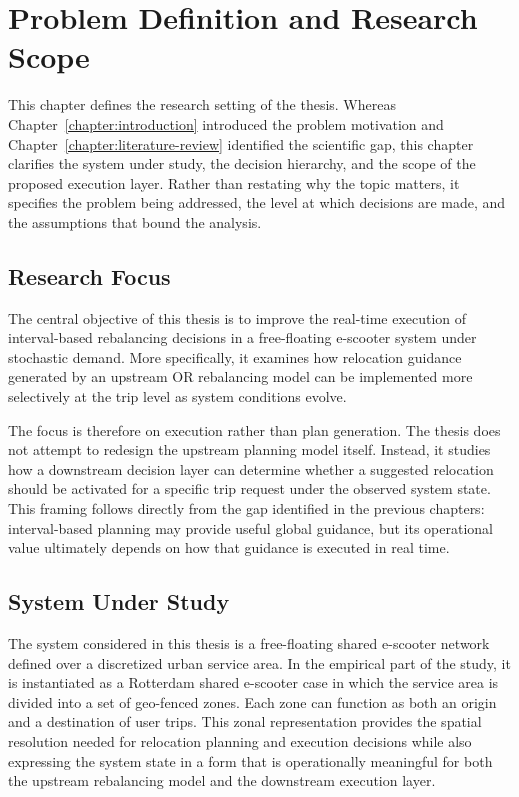 \chapter{Problem Definition and Research Scope}
\label{chapter:objectives-problem}

This chapter defines the research setting of the thesis. Whereas Chapter~\ref{chapter:introduction} introduced the problem motivation and Chapter~\ref{chapter:literature-review} identified the scientific gap, this chapter clarifies the system under study, the decision hierarchy, and the scope of the proposed execution layer. Rather than restating why the topic matters, it specifies the problem being addressed, the level at which decisions are made, and the assumptions that bound the analysis.

\section{Research Focus}

The central objective of this thesis is to improve the real-time execution of interval-based rebalancing decisions in a free-floating e-scooter system under stochastic demand. More specifically, it examines how relocation guidance generated by an upstream OR rebalancing model can be implemented more selectively at the trip level as system conditions evolve.

The focus is therefore on execution rather than plan generation. The thesis does not attempt to redesign the upstream planning model itself. Instead, it studies how a downstream decision layer can determine whether a suggested relocation should be activated for a specific trip request under the observed system state. This framing follows directly from the gap identified in the previous chapters: interval-based planning may provide useful global guidance, but its operational value ultimately depends on how that guidance is executed in real time.

\section{System Under Study}

The system considered in this thesis is a free-floating shared e-scooter network defined over a discretized urban service area. In the empirical part of the study, it is instantiated as a Rotterdam shared e-scooter case in which the service area is divided into a set of geo-fenced zones. Each zone can function as both an origin and a destination of user trips. This zonal representation provides the spatial resolution needed for relocation planning and execution decisions while also expressing the system state in a form that is operationally meaningful for both the upstream rebalancing model and the downstream execution layer.

